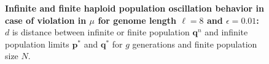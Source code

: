 \begin{figure}[H]
\begin{center}
\hspace{5pt}
\hspace{5pt}


\caption{\textbf{Infinite and finite haploid population oscillation behavior in case of violation in $\mu$ for genome length $\ell = 8$ and $\epsilon = 0.01$:} $d$ is
  distance between infinite or finite population ${\bm q}^n$ and infinite
  population limits ${{\bm p}^\ast}$ and ${{\bm q}^{\ast}}$ for $g$ generations and finite population size $N$.}
\label{oscillation_8h_vio_mu_0.01}
\end{center}
\end{figure}

